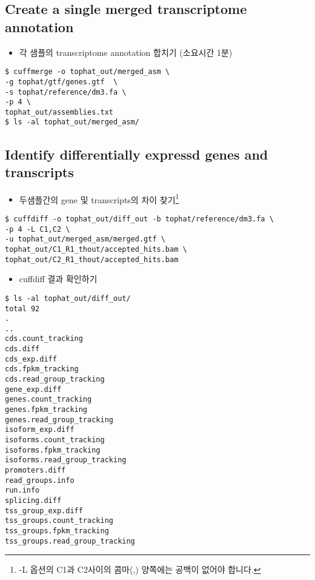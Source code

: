 \documentclass{article}
\begin{document}
\subsection{Create a single merged transcriptome annotation}
\begin{itemize}
\item
  \begin{itemize}
  각 샘플의 transcriptome annotation 합치기 (소요시간 1분)
  \end{itemize}
\end{itemize}
\begin{lstlisting}[frame=single,style=Bash,xleftmargin=1.4cm,xrightmargin=1.4cm]
$ cuffmerge -o tophat_out/merged_asm \
-g tophat/gtf/genes.gtf  \
-s tophat/reference/dm3.fa \
-p 4 \
tophat_out/assemblies.txt 
$ ls -al tophat_out/merged_asm/
\end{lstlisting}

\subsection{Identify differentially expressd genes and transcripts}

\begin{itemize}
\item
  \begin{itemize}
  두샘플간의 gene 및 transcripts의 차이 찾기\footnote{-L 옵션의 C1과 C2사이의 콤마(,) 양쪽에는 공백이 없어야 합니다.}  
  \end{itemize}
\end{itemize}
\begin{lstlisting}[frame=single,style=Bash,xleftmargin=1.4cm,xrightmargin=1.4cm]
$ cuffdiff -o tophat_out/diff_out -b tophat/reference/dm3.fa \
-p 4 -L C1,C2 \
-u tophat_out/merged_asm/merged.gtf \
tophat_out/C1_R1_thout/accepted_hits.bam \
tophat_out/C2_R1_thout/accepted_hits.bam
\end{lstlisting}

\begin{itemize}
\item
  \begin{itemize}
  cuffdiff 결과 확인하기  
  \end{itemize}
\end{itemize}
\begin{lstlisting}[frame=single,style=Bash,xleftmargin=1.4cm,xrightmargin=1.4cm]
$ ls -al tophat_out/diff_out/
total 92
.
..
cds.count_tracking
cds.diff
cds_exp.diff
cds.fpkm_tracking
cds.read_group_tracking
gene_exp.diff
genes.count_tracking
genes.fpkm_tracking
genes.read_group_tracking
isoform_exp.diff
isoforms.count_tracking
isoforms.fpkm_tracking
isoforms.read_group_tracking
promoters.diff
read_groups.info
run.info
splicing.diff
tss_group_exp.diff
tss_groups.count_tracking
tss_groups.fpkm_tracking
tss_groups.read_group_tracking
\end{lstlisting}
\end{document}
